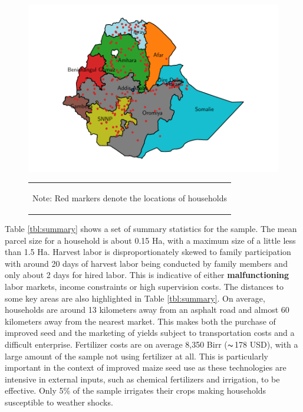 \documentclass[11pt]{article}
\begin{document}
\begin{figure}[H]
    \centering
    \caption{Spatial Distribution of Households Surveyed}\label{map:regions}
    \includegraphics[width=.7\textwidth]{results/figures/map_hhids.pdf}
    \vspace*{-1em}
    \begin{table}[H]
        \centering
        \begin{tabular}{p{}} 
            \begin{tablenotes}
                  \small
                  \item Note: Red markers denote the locations of households
            \end{tablenotes}
        \end{tabular}
    \end{table}  
\end{figure}

Table \ref{tbl:summary} shows a set of summary statistics for the sample. The mean parcel size for a household is about 0.15 Ha, with a maximum size of a little less than 1.5 Ha. Harvest labor is disproportionately skewed to family participation with around 20 days of harvest labor being conducted by family members and only about 2 days for hired labor. This is indicative of either \textbf{malfunctioning} labor markets, income constraints or high supervision costs. The distances to some key areas are also highlighted in Table \ref{tbl:summary}. On average, households are around 13 kilometers away from an asphalt road and almost 60 kilometers away from the nearest market. This makes both the purchase of improved seed and the marketing of yields subject to transportation costs and a difficult enterprise. Fertilizer costs are on average 8,350 Birr ($\thicksim$178 USD), with a large amount of the sample not using fertilizer at all. This is particularly important in the context of improved maize seed use as these technologies are intensive in external inputs, such as chemical fertilizers and irrigation, to be effective. Only 5\% of the sample irrigates their crops making households susceptible to weather shocks.
\end{document}

